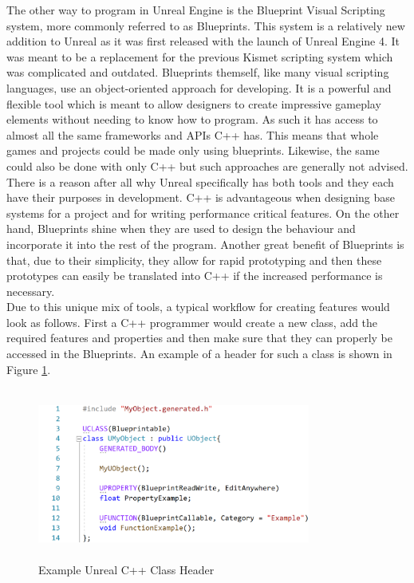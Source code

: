 The other way to program in Unreal Engine is the Blueprint Visual Scripting system, more commonly referred to as Blueprints\cite{bib:UEBlueprints}. This system is a relatively new addition to Unreal as it was first released with the launch of Unreal Engine 4. It was meant to be a replacement for the previous Kismet scripting system which was complicated and outdated\cite{bib:UEBlueChanges}. Blueprints themself, like many visual scripting languages, use an object-oriented approach for developing. It is a powerful and flexible tool which is meant to allow designers to create impressive gameplay elements without needing to know how to program\cite{bib:UEBlueprints}. As such it has access to almost all the same frameworks and APIs C++ has. This means that whole games and projects could be made only using blueprints. Likewise, the same could also be done with only C++ but such approaches are generally not advised. There is a reason after all why Unreal specifically has both tools and they each have their purposes in development. C++ is advantageous when designing base systems for a project and for writing performance critical features. On the other hand, Blueprints shine when they are used to design the behaviour and incorporate it into the rest of the program. Another great benefit of Blueprints is that, due to their simplicity, they allow for rapid prototyping and then these prototypes can easily be translated into C++ if the increased performance is necessary.\\
Due to this unique mix of tools, a typical workflow for creating features would look as follows. First a C++ programmer would create a new class, add the required features and properties and then make sure that they can properly be accessed in the Blueprints. An example of a header for such a class is shown in Figure \ref{fig:ClassExample}.
\begin{figure}[htpb]
	\centering
	\includegraphics[width=0.8\textwidth,height=160pt]{fig/ClassExample3.png}
	\caption[Example Unreal C++ Class Header]{Example Unreal C++ Class Header\protect}
	\label{fig:ClassExample}
\end{figure}
